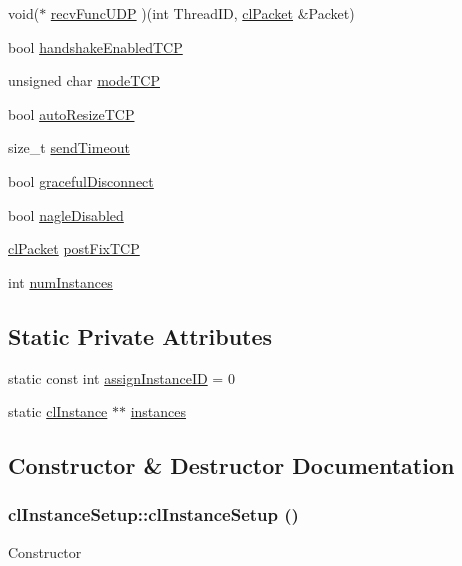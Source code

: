 \begin{DoxyCompactItemize}
\item 
void($\ast$ \hyperlink{classcl_instance_setup_aef8ff6fa818c71994b82807842c583c6}{recvFuncUDP} )(int ThreadID, \hyperlink{classcl_packet}{clPacket} \&Packet)
\item 
bool \hyperlink{classcl_instance_setup_a9ed34974bb534f753f000490f8089d6a}{handshakeEnabledTCP}
\item 
unsigned char \hyperlink{classcl_instance_setup_a7ad7f0ee077f5efdeb6140dfd30d8dbb}{modeTCP}
\item 
bool \hyperlink{classcl_instance_setup_a6c8317c2c68452633ce0b16f22f52ded}{autoResizeTCP}
\item 
size\_\-t \hyperlink{classcl_instance_setup_aba8346dc52f0073ef110675593b71af6}{sendTimeout}
\item 
bool \hyperlink{classcl_instance_setup_a9aace39dd40220ba6718fdae22e32970}{gracefulDisconnect}
\item 
bool \hyperlink{classcl_instance_setup_a0326fa43d0d08783d371c7aab79f6d75}{nagleDisabled}
\item 
\hyperlink{classcl_packet}{clPacket} \hyperlink{classcl_instance_setup_a165b8b2dbed85b5b1ba3866cd9f06273}{postFixTCP}
\item 
int \hyperlink{classcl_instance_setup_a4163ffe3de7fb003f97e436491235b28}{numInstances}
\end{DoxyCompactItemize}
\subsection*{Static Private Attributes}
\begin{DoxyCompactItemize}
\item 
static const int \hyperlink{classcl_instance_setup_abfe57f0506bbc15ac6ff7e045ccb9b6d}{assignInstanceID} = 0
\item 
static \hyperlink{classcl_instance}{clInstance} $\ast$$\ast$ \hyperlink{classcl_instance_setup_a4c192965c87e9d50508c05589815139f}{instances}
\end{DoxyCompactItemize}


\subsection{Constructor \& Destructor Documentation}
\hypertarget{classcl_instance_setup_a4176ba764e03839962dc65563d3b35bb}{
\subsubsection[{clInstanceSetup}]{\setlength{\rightskip}{0pt plus 5cm}clInstanceSetup::clInstanceSetup ()}}
\label{classcl_instance_setup_a4176ba764e03839962dc65563d3b35bb}
Constructor 

